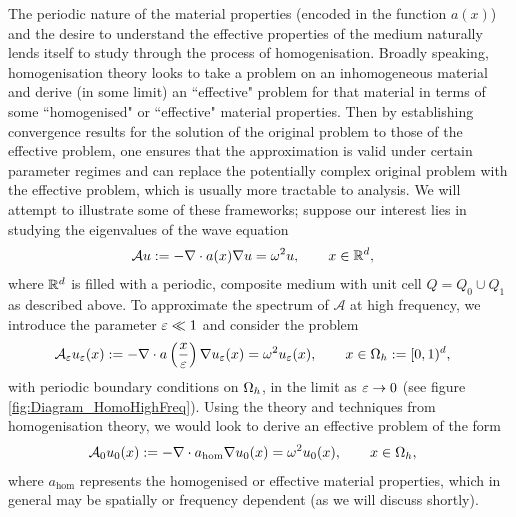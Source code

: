 The periodic nature of the material properties (encoded in the function $a(x)$) and the desire to understand the effective properties of the medium naturally lends itself to study through the process of homogenisation.
Broadly speaking, homogenisation theory looks to take a problem on an inhomogeneous material and derive (in some limit) an ``effective" problem for that material in terms of some ``homogenised" or ``effective" material properties.
Then by establishing convergence results for the solution of the original problem to those of the effective problem, one ensures that the approximation is valid under certain parameter regimes and can replace the potentially complex original problem with the effective problem, which is usually more tractable to analysis.
We will attempt to illustrate some of these frameworks; suppose our interest lies in studying the eigenvalues of the wave equation 
\begin{align*} 
	\mathcal{A}u &:= -\nabla\cdot a(x)\nabla u = \omega^2 u, \qquad x\in\mathbb{R}^d,
\end{align*}
where $\mathbb{R}^d$ is filled with a periodic, composite medium with unit cell $Q=Q_0\cup Q_1$ as described above.
To approximate the spectrum of $\mathcal{A}$ at high frequency, we introduce the parameter $\varepsilon\ll 1$ and consider the problem
\begin{align} \label{eq:Homo-HighFreqApprox}
	\mathcal{A}_{\varepsilon}u_{\varepsilon}(x) &:= -\nabla\cdot a\left( \frac{x}{\varepsilon} \right)\nabla u_{\varepsilon}(x) = \omega^2 u_{\varepsilon}(x), \qquad x\in\Omega_{h}:=[0,1)^d,
\end{align}
with periodic boundary conditions on $\Omega_h$, in the limit as $\varepsilon\rightarrow0$ (see figure \ref{fig:Diagram_HomoHighFreq}).
Using the theory and techniques from homogenisation theory, we would look to derive an effective problem of the form
\begin{align} \label{eq:Homo-HighFreqApproxEffective}
	\mathcal{A}_0 u_0(x) &:= -\nabla\cdot a_{\mathrm{hom}}\nabla u_0(x) = \omega^2 u_0(x), \qquad x\in\Omega_h,
\end{align} 
where $a_{\mathrm{hom}}$ represents the homogenised or effective material properties, which in general may be spatially or frequency dependent (as we will discuss shortly).
